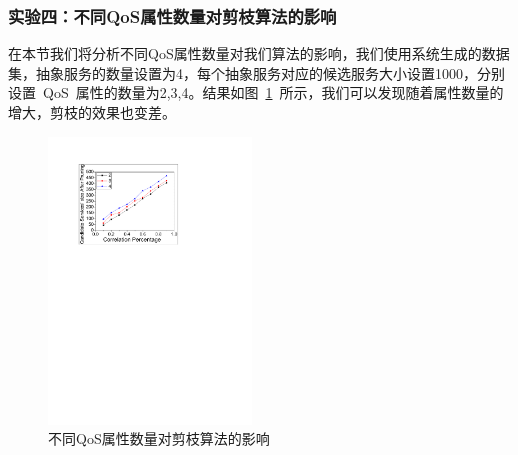 \subsubsection{实验四：不同QoS属性数量对剪枝算法的影响}

在本节我们将分析不同QoS属性数量对我们算法的影响，我们使用系统生成的数据集，抽象服务的数量设置为4，每个抽象服务对应的候选服务大小设置1000，分别设置~QoS~属性的数量为2,3,4。结果如图~\ref{F:Fig_Exp_EffeCandDiffDimenDiffCorr}~所示，我们可以发现随着属性数量的增大，剪枝的效果也变差。

\begin{figure}[!thb]
    \centering
    \includegraphics[width=0.48\textwidth]{./FIGs/Experiments/csky_computing/Fig_EffeCandDiffDimenDiffCorr.pdf}
    \caption{不同QoS属性数量对剪枝算法的影响}
    \label{F:Fig_Exp_EffeCandDiffDimenDiffCorr}
\end{figure}


